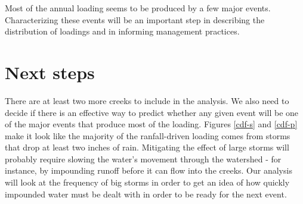 \documentclass[12pt]{article}
\begin{document}
Most of the annual loading seems to be produced by a few major events. Characterizing these events will be an important step in describing the distribution of loadings and in informing management practices.\\

\section{Next steps}
There are at least two more creeks to include in the analysis. We also need to decide if there is an effective way to predict whether any given event will be one of the major events that produce most of the loading. Figures \ref{cdf-s} and \ref{cdf-p} make it look like the majority of the ranfall-driven loading comes from storms that drop at least two inches of rain. Mitigating the effect of large storms will probably require slowing the water's movement through the watershed - for instance, by impounding runoff before it can flow into the creeks. Our analysis will look at the frequency of big storms in order to get an idea of how quickly impounded water must be dealt with in order to be ready for the next event.

\end{document}
